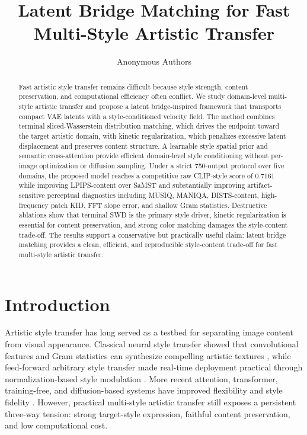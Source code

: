 \documentclass{article}
\title{Latent Bridge Matching for Fast Multi-Style Artistic Transfer}
\author{Anonymous Authors}
\date{}
\begin{document}
\maketitle

\begin{abstract}
Fast artistic style transfer remains difficult because style strength, content preservation, and computational efficiency often conflict. We study domain-level multi-style artistic transfer and propose a latent bridge-inspired framework that transports compact VAE latents with a style-conditioned velocity field. The method combines terminal sliced-Wasserstein distribution matching, which drives the endpoint toward the target artistic domain, with kinetic regularization, which penalizes excessive latent displacement and preserves content structure. A learnable style spatial prior and semantic cross-attention provide efficient domain-level style conditioning without per-image optimization or diffusion sampling. Under a strict 750-output protocol over five domains, the proposed model reaches a competitive raw CLIP-style score of 0.7161 while improving LPIPS-content over SaMST and substantially improving artifact-sensitive perceptual diagnostics including MUSIQ, MANIQA, DISTS-content, high-frequency patch KID, FFT slope error, and shallow Gram statistics. Destructive ablations show that terminal SWD is the primary style driver, kinetic regularization is essential for content preservation, and strong color matching damages the style-content trade-off. The results support a conservative but practically useful claim: latent bridge matching provides a clean, efficient, and reproducible style-content trade-off for fast multi-style artistic transfer.
\end{abstract}

\section{Introduction}
Artistic style transfer has long served as a testbed for separating image content from visual appearance. Classical neural style transfer showed that convolutional features and Gram statistics can synthesize compelling artistic textures \cite{gatys2016image}, while feed-forward arbitrary style transfer made real-time deployment practical through normalization-based style modulation \cite{huang2017adain}. More recent attention, transformer, training-free, and diffusion-based systems have improved flexibility and style fidelity \cite{park2019sanet,deng2022stytr2,hong2023aespa,huang2024aesfa,gim2024cast,chung2024styleid}. However, practical multi-style artistic transfer still exposes a persistent three-way tension: strong target-style expression, faithful content preservation, and low computational cost.
\end{document}
